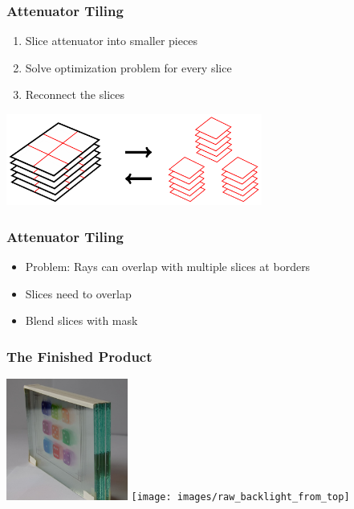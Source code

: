 \documentclass[12pt, compress]{beamer}
\begin{document}
\begin{frame}[fragile]
	\frametitle{Attenuator Tiling}
	
	\begin{enumerate}
		\item Slice attenuator into smaller pieces
		\item Solve optimization problem for every slice
		\item Reconnect the slices
	\end{enumerate}
	
	\vspace{1cm}
	
	\begin{center}
		\includegraphics[height = 3cm]{figures/slicing_attenuator/tiling_overview.pdf}
	\end{center}
\end{frame}

\begin{frame}[fragile]
	\frametitle{Attenuator Tiling}

	\begin{itemize}
		\item Problem: Rays can overlap with multiple slices at borders
		\item Slices need to overlap
		\item Blend slices with mask
	\end{itemize}
\end{frame}

\begin{frame}[fragile]
	\frametitle{The Finished Product}
	\begin{center}
		\includegraphics[height=4cm]{images/glass_plates_front_view_cropped}
		\hspace{1cm}
		\texttt{[image: images/raw\_backlight\_from\_top]}
	\end{center}
\end{frame}
\end{document}
